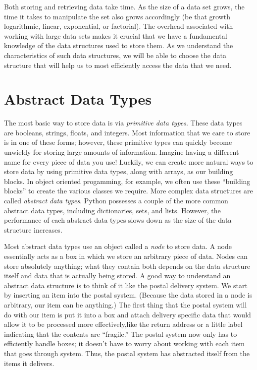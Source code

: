 \label{lab:Python_DataStructures}

Both storing and retrieving data take time. As the size of a data set grows, 
the time it takes to manipulate the set also grows accordingly (be that growth logarithmic, 
linear, exponential, or factorial). The overhead associated with working with large 
data sets makes it crucial that we have a fundamental knowledge of the data 
structures used to store them. As we understand the characteristics of such data 
structures, we will be able to choose the data structure that will help us to most 
efficiently access the data that we need. 

\section*{Abstract Data Types}

The most basic way to store data is via \emph{primitive data types}.
These data types are booleans, strings, floats, and integers.
Most information that we care to store is in one of these forms;
however, these primitive types can quickly become unwieldy for storing large 
amounts of information.
Imagine having a different name for every piece of data you use!
Luckily, we can create more natural ways to store data by using primitive data 
types, along with arrays, as our building blocks. In object oriented progamming, 
for example, we often use these ``building blocks'' to create the various classes
we require.
More complex data structures are called \emph{abstract data types}.
Python possesses a couple of the more common abstract data types, including 
dictionaries, sets, and lists.
However, the performance of each abstract data types slows down as the 
size of the data structure increases. 

Most abstract data types use an object called a \emph{node} to store data.
A node essentially acts as a box in which we store an arbitrary piece of data.
Nodes can store absolutely anything; what they contain both depends on the 
data structure itself and data that is actually being stored.
A good way to understand an abstract data structure is to think of it like the 
postal delivery system. We start by inserting an item into the postal system.  
(Because the data stored in a node is arbitrary, our item can be anything.)
The first thing that the postal system will do with our item is put it into a 
box and attach delivery specific data that would allow it to be processed more 
effectively,like the return address or a little label indicating that the 
contents are ``fragile.'' The postal system now only has to efficiently handle 
boxes; it doesn't have to worry about working with each item that goes through 
system. Thus, the postal system has abstracted itself from the items it delivers.

